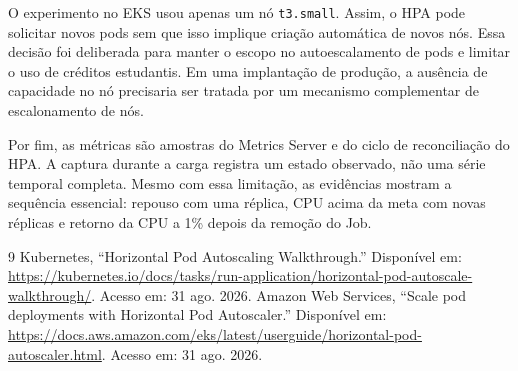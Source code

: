 \documentclass[conference]{IEEEtran}
\begin{document}
O experimento no EKS usou apenas um nó \texttt{t3.small}. Assim, o HPA pode solicitar novos pods sem que isso implique criação automática de novos nós. Essa decisão foi deliberada para manter o escopo no autoescalamento de pods e limitar o uso de créditos estudantis. Em uma implantação de produção, a ausência de capacidade no nó precisaria ser tratada por um mecanismo complementar de escalonamento de nós.

Por fim, as métricas são amostras do Metrics Server e do ciclo de reconciliação do HPA. A captura durante a carga registra um estado observado, não uma série temporal completa. Mesmo com essa limitação, as evidências mostram a sequência essencial: repouso com uma réplica, CPU acima da meta com novas réplicas e retorno da CPU a 1\% depois da remoção do Job.

\clearpage
\begin{thebibliography}{9}
 Kubernetes, ``Horizontal Pod Autoscaling Walkthrough.'' Disponível em: \url{https://kubernetes.io/docs/tasks/run-application/horizontal-pod-autoscale-walkthrough/}. Acesso em: 31 ago. 2026.
 Amazon Web Services, ``Scale pod deployments with Horizontal Pod Autoscaler.'' Disponível em: \url{https://docs.aws.amazon.com/eks/latest/userguide/horizontal-pod-autoscaler.html}. Acesso em: 31 ago. 2026.
\end{thebibliography}
\end{document}
